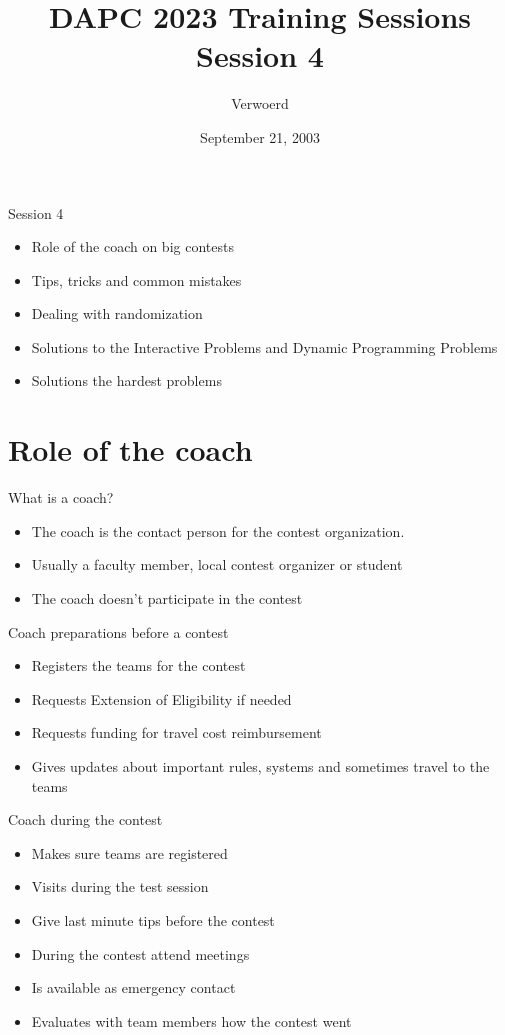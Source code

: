 \documentclass[11pt,pdf, aspectratio=169]{beamer}
\title{DAPC 2023 Training Sessions\\Session 4}
\author{Verwoerd}
\date{September 21, 2003}
\begin{document}
  \maketitle
  \begin{frame}{Session 4}
    \begin{itemize}
      \item Role of the coach on big contests
      \item Tips, tricks and common mistakes
      \item Dealing with randomization
      \item Solutions to the Interactive Problems and Dynamic Programming Problems
      \item Solutions the hardest problems
    \end{itemize}
    \doclicenseThis
  \end{frame}


  \section{Role of the coach}
  \begin{frame}{What is a coach?}
    \begin{itemize}
      \item The coach is the contact person for the contest organization.
      \item Usually a faculty member, local contest organizer or student
      \item The coach doesn't participate in the contest
    \end{itemize}
  \end{frame}
  \begin{frame}{Coach preparations before a contest}
    \begin{itemize}
      \item Registers the teams for the contest
      \item Requests Extension of Eligibility if needed
      \item Requests funding for travel cost reimbursement
      \item Gives updates about important rules, systems and sometimes travel to the teams
    \end{itemize}
  \end{frame}
  \begin{frame}{Coach during the contest}
    \begin{itemize}
      \item Makes sure teams are registered
      \item Visits during the test session
      \item Give last minute tips before the contest
      \item During the contest attend meetings
      \item Is available as emergency contact
      \item Evaluates with team members how the contest went
    \end{itemize}
  \end{frame}
\end{document}
